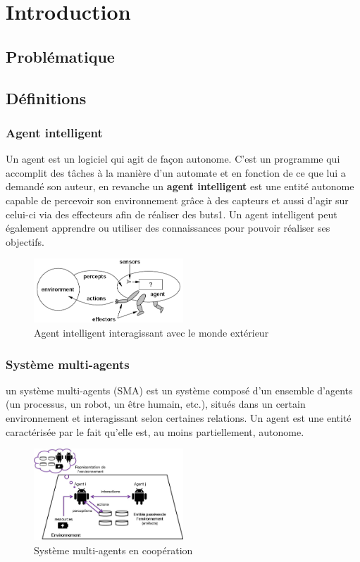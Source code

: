 \chapter{Introduction}
\section{Problématique}
\section{Définitions}
\subsection{Agent intelligent}
Un agent est un logiciel qui agit de façon autonome. C'est un programme qui accomplit des tâches à la manière d'un automate et en fonction de ce que lui a demandé son auteur, en revanche un \textbf{agent intelligent} est une entité autonome capable de percevoir son environnement grâce à des capteurs et aussi d'agir sur celui-ci via des effecteurs afin de réaliser des buts1. Un agent intelligent peut également apprendre ou utiliser des connaissances pour pouvoir réaliser ses objectifs.
\begin{figure}[H]
	\centering
	\includegraphics[width=0.5\textwidth]{imgs/intelligentAgent.png}
	\caption{Agent intelligent interagissant avec le monde extérieur }
\end{figure}
\newpage
\subsection{Système multi-agents}
un système multi-agents (SMA) est un système composé d'un ensemble d'agents (un processus, un robot, un être humain, etc.), situés dans un certain environnement et interagissant selon certaines relations. Un agent est une entité caractérisée par le fait qu'elle est, au moins partiellement, autonome.
\begin{figure}[H]
	\centering
	\includegraphics[width=0.5\textwidth]{imgs/SMA.jpg}
	\caption{Système multi-agents en coopération}
\end{figure}
